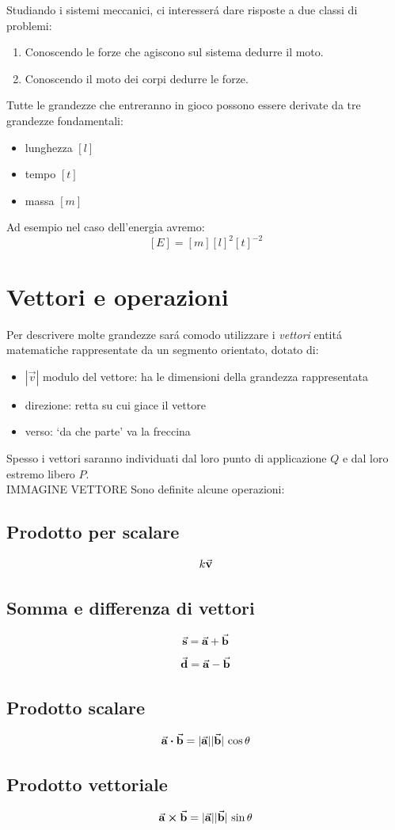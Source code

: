 \documentclass[14pt]{report}
\begin{document}
Studiando i sistemi meccanici, ci interesserá dare risposte a due classi di problemi:
\begin{enumerate}[noitemsep]
\item Conoscendo le forze che agiscono sul sistema dedurre il moto.
\item Conoscendo il moto dei corpi dedurre le forze.
\end{enumerate}
Tutte le grandezze che entreranno in gioco possono essere derivate da tre grandezze fondamentali:
\begin{itemize}[noitemsep]
\item lunghezza $[l]$
\item tempo $[t]$
\item massa $[m]$
\end{itemize}
Ad esempio nel caso dell'energia avremo:\[[E]=[m][l]^2[t]^{-2}\]

\section{Vettori e operazioni}

Per descrivere molte grandezze sará comodo utilizzare i \emph{vettori} entitá matematiche rappresentate da un segmento orientato, dotato di:
\begin{itemize}
\item $|\vec{v}|$ modulo del vettore: ha le dimensioni della grandezza rappresentata
\item direzione: retta su cui giace il vettore
\item verso: `da che parte' va la freccina
\end{itemize}
Spesso i vettori saranno individuati dal loro punto di applicazione $Q$ e dal loro estremo libero $P$.\\IMMAGINE VETTORE
Sono definite alcune operazioni:
\subsection{Prodotto per scalare}
\[k\va{v}\]
\subsection{Somma e differenza di vettori}
\[\va{s}=\va{a}+\va{b}\]
\[\va{d}=\va{a}-\va{b}\]
\subsection{Prodotto scalare}
\[\va{a}\vdot\va{b}=\abs{\va{a}}\abs*{\va{b}}\cos\theta\]
\subsection{Prodotto vettoriale}
\[\va{a}\cp\va{b}=\abs{\va{a}}\abs*{\va{b}}\sin\theta\]
\end{document}
